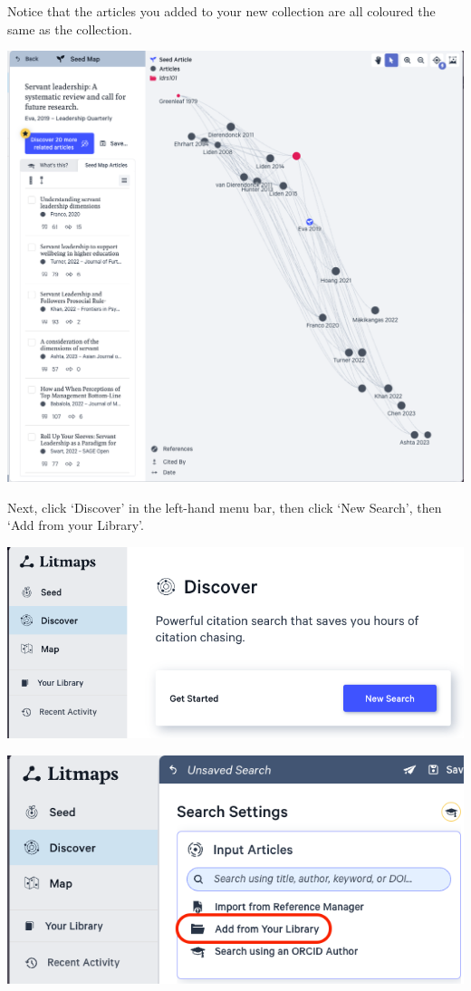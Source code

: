 \documentclass[
]{book}
\theoremstyle{definition}
\theoremstyle{definition}
\theoremstyle{definition}
\theoremstyle{definition}
\theoremstyle{remark}
\begin{document}
Notice that the articles you added to your new collection are all coloured the same as the collection.

\includegraphics{assets/u2/litmaps4.png}

Next, click `Discover' in the left-hand menu bar, then click `New Search', then `Add from your Library'.

\includegraphics{assets/u2/litmaps5.png}

\includegraphics{assets/u2/litmaps6.png}
\end{document}
